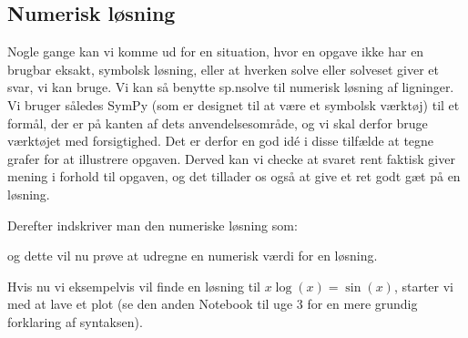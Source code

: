 \documentclass[letterpaper,10pt,english]{jupyterBook}
\begin{document}
\subsection{Numerisk løsning}
\label{\detokenize{notebooks/sympy/Notebook3_ligninger:numerisk-losning}}
Nogle gange kan vi komme ud for en situation, hvor en opgave ikke har en brugbar eksakt, symbolsk løsning, eller at hverken solve eller solveset giver et svar, vi kan bruge. Vi kan så benytte sp.nsolve til numerisk løsning af ligninger. Vi bruger således SymPy (som er designet til at være et symbolsk værktøj) til et formål, der er på kanten af dets anvendelsesområde, og vi skal derfor bruge værktøjet med forsigtighed. Det er derfor en god idé i disse tilfælde at tegne grafer for at illustrere opgaven. Derved kan vi checke at svaret rent faktisk giver mening i forhold til opgaven, og det tillader os også at give et ret godt gæt på en løsning.

Derefter indskriver man den numeriske løsning som:

\begin{sphinxVerbatim}[commandchars=\\\{\}]
  
\end{sphinxVerbatim}

og dette vil nu prøve at udregne en numerisk værdi for en løsning.

Hvis nu vi eksempelvis vil finde en løsning til \(x\log(x) = \sin(x)\), starter vi med at lave et plot (se den anden Notebook til uge 3 for en mere grundig forklaring af syntaksen).

\begin{sphinxVerbatim}[commandchars=\\\{\}]
   
   

          
\end{sphinxVerbatim}

\noindent{}
\end{document}
